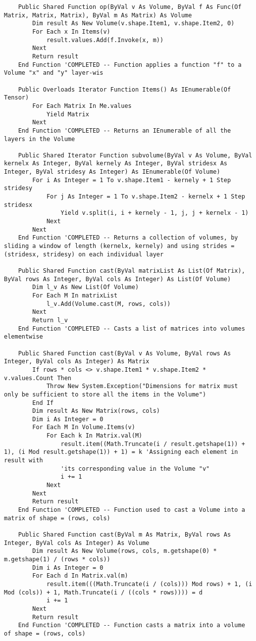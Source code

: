\begin{verbatim}
    Public Shared Function op(ByVal v As Volume, ByVal f As Func(Of Matrix, Matrix, Matrix), ByVal m As Matrix) As Volume
        Dim result As New Volume(v.shape.Item1, v.shape.Item2, 0)
        For Each x In Items(v)
            result.values.Add(f.Invoke(x, m))
        Next
        Return result
    End Function 'COMPLETED -- Function applies a function "f" to a Volume "x" and "y" layer-wis
    
    Public Overloads Iterator Function Items() As IEnumerable(Of Tensor)
        For Each Matrix In Me.values
            Yield Matrix
        Next
    End Function 'COMPLETED -- Returns an IEnumerable of all the layers in the Volume

    Public Shared Iterator Function subvolume(ByVal v As Volume, ByVal kernelx As Integer, ByVal kernely As Integer, ByVal stridesx As Integer, ByVal stridesy As Integer) As IEnumerable(Of Volume)
        For i As Integer = 1 To v.shape.Item1 - kernely + 1 Step stridesy
            For j As Integer = 1 To v.shape.Item2 - kernelx + 1 Step stridesx
                Yield v.split(i, i + kernely - 1, j, j + kernelx - 1)
            Next
        Next
    End Function 'COMPLETED -- Returns a collection of volumes, by sliding a window of length (kernelx, kernely) and using strides = (stridesx, stridesy) on each individual layer
   
    Public Shared Function cast(ByVal matrixList As List(Of Matrix), ByVal rows As Integer, ByVal cols As Integer) As List(Of Volume)
        Dim l_v As New List(Of Volume)
        For Each M In matrixList
            l_v.Add(Volume.cast(M, rows, cols))
        Next
        Return l_v
    End Function 'COMPLETED -- Casts a list of matrices into volumes elementwise

    Public Shared Function cast(ByVal v As Volume, ByVal rows As Integer, ByVal cols As Integer) As Matrix
        If rows * cols <> v.shape.Item1 * v.shape.Item2 * v.values.Count Then
            Throw New System.Exception("Dimensions for matrix must only be sufficient to store all the items in the Volume")
        End If
        Dim result As New Matrix(rows, cols)
        Dim i As Integer = 0
        For Each M In Volume.Items(v)
            For Each k In Matrix.val(M)
                result.item((Math.Truncate(i / result.getshape(1)) + 1), (i Mod result.getshape(1)) + 1) = k 'Assigning each element in result with 
                'its corresponding value in the Volume "v"
                i += 1
            Next
        Next
        Return result
    End Function 'COMPLETED -- Function used to cast a Volume into a matrix of shape = (rows, cols)

    Public Shared Function cast(ByVal m As Matrix, ByVal rows As Integer, ByVal cols As Integer) As Volume
        Dim result As New Volume(rows, cols, m.getshape(0) * m.getshape(1) / (rows * cols))
        Dim i As Integer = 0
        For Each d In Matrix.val(m)
            result.item(((Math.Truncate(i / (cols))) Mod rows) + 1, (i Mod (cols)) + 1, Math.Truncate(i / ((cols * rows)))) = d
            i += 1
        Next
        Return result
    End Function 'COMPLETED -- Function casts a matrix into a volume of shape = (rows, cols)

\end{verbatim}